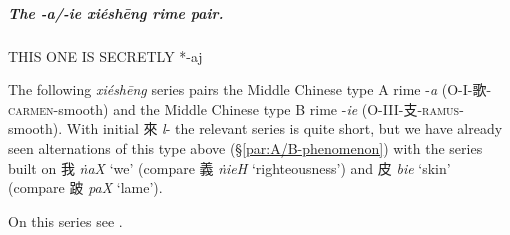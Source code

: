 \subparagraph{The -\textit{a}/-\textit{ie} \textit{xiéshēng} rime pair.}
\label{subpar:a-ie-XS-pair}


THIS ONE IS SECRETLY *-aj

The following \textit{xiéshēng} series pairs the Middle Chinese type A rime -\textit{a} (O-I-歌-\textsc{carmen}-smooth) and the Middle Chinese type B rime -\textit{ie} (O-III-支-\textsc{ramus}-smooth). 
With initial 來 \textit{l}- the relevant series is quite short, but we have already seen alternations of this type above (§\ref{par:A/B-phenomenon}) 
with the series built on {\large{我}}
\textit{ṅaX} `we' (compare {\large{義}} \textit{ṅieH} `righteousness') and {\large{皮}} \textit{bie} `skin' (compare {\large{跛}} \textit{paX} `lame').



On this series see \citep[269-270]{Baxter2014OldChinese}. 



